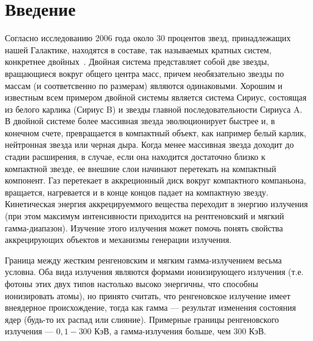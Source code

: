 \section*{Введение}

	
	Согласно исследованию 2006 года около 30 процентов звезд, принадлежащих нашей Галактике, находятся в составе, так называемых кратных систем, конкретнее двойных~\cite{charlesj.lada}. Двойная система представляет собой две звезды, вращающиеся вокруг общего центра масс, причем необязательно звезды по массам (и соответсвенно по размерам) являются одинаковыми. Хорошим и известным всем примером двойной системы является система Сириус, состоящая из белого карлика (Сириус B) и звезды главной последовательности Сириуса A. В двойной системе более массивная звезда эволюционирует быстрее и, в конечном счете, превращается в компактный объект, как например белый карлик, нейтронная звезда или черная дыра. Когда менее массивная звезда доходит до стадии расширения, в случае, если она находится достаточно близко к компактной звезде, ее внешние слои начинают перетекать на компактный компонент. Газ перетекает в аккреционный диск вокруг компактного компаньона, вращается, нагревается и в конце концов падает на компактную звезду. Кинетическая энергия аккрецируеммого вещества переходит в энергию излучения (при этом максимум интенсивности приходится на рентгеновский и мягкий гамма-диапазон). Изучение этого излучения может помочь понять свойства аккрецирующих объектов и механизмы генерации излучения.
	
	Граница между жестким ренгеновским и мягким гамма-излучением весьма условна. Оба вида излучения являются формами ионизирующего излучения (т.е. фотоны этих двух типов настолько высоко энергичны, что способны ионизировать атомы), но принято считать, что ренгеновское излучение имеет внеядерное происхождение, тогда как гамма --- результат изменения состояния ядер (будь-то их распад или слияние). Примерные границы ренгеновского излучения --- $0{,}1 - 300 $ КэВ, а гамма-излучения больше, чем $300$ КэВ.

